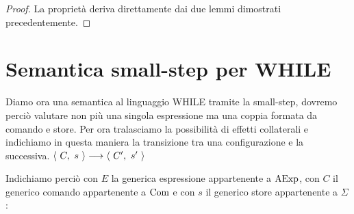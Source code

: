 \begin{proof}
  La proprietà deriva direttamente dai due lemmi dimostrati precedentemente.
\end{proof}

\section{Semantica small-step per WHILE} 
Diamo ora una semantica al linguaggio WHILE tramite la small-step, dovremo perciò valutare non più una singola espressione ma una coppia formata da comando e store. Per ora tralasciamo la possibilità di effetti collaterali e indichiamo in questa maniera la transizione tra una configurazione e la successiva.
$
\langle\ C,\ s\ \rangle \longrightarrow \langle\ C',\ s'\ \rangle
$

Indichiamo perciò con $E$ la generica espressione appartenente a $\mathrm{AExp}$, con $C$ il generico comando appartenente a $\mathrm{Com}$ e con $s$ il generico store appartenente a $\Sigma$:

